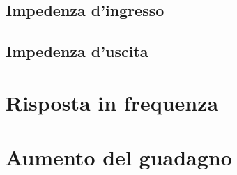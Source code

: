 \documentclass[10pt,a4paper]{article}
\begin{document}
\subsection{Impedenza d'ingresso}

\subsection{Impedenza d'uscita}

\section{Risposta in frequenza}

\section{Aumento del guadagno}
\end{document}
